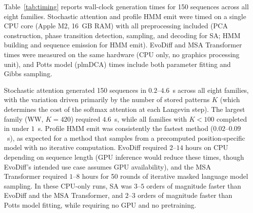 \documentclass[10pt]{article}
\begin{document}
Table~\ref{tab:timing} reports wall-clock generation times for 150 sequences across all eight families. Stochastic attention and profile HMM emit were timed on a single CPU core (Apple M2, 16~GB RAM) with all preprocessing included (PCA construction, phase transition detection, sampling, and decoding for SA; HMM building and sequence emission for HMM emit). EvoDiff and MSA Transformer times were measured on the same hardware (CPU only, no graphics processing unit), and Potts model (plmDCA) times include both parameter fitting and Gibbs sampling.

Stochastic attention generated 150 sequences in $0.2$--$4.6$~s across all eight families, with the variation driven primarily by the number of stored patterns $K$ (which determines the cost of the softmax attention at each Langevin step). The largest family (WW, $K{=}420$) required $4.6$~s, while all families with $K < 100$ completed in under $1$~s. Profile HMM emit was consistently the fastest method ($0.02$--$0.09$~s), as expected for a method that samples from a precomputed position-specific model with no iterative computation. EvoDiff required $2$--$14$ hours on CPU depending on sequence length (GPU inference would reduce these times, though EvoDiff's intended use case assumes GPU availability), and the MSA Transformer required $1$--$8$ hours for 50 rounds of iterative masked language model sampling. In these CPU-only runs, SA was $3$--$5$ orders of magnitude faster than EvoDiff and the MSA Transformer, and $2$--$3$ orders of magnitude faster than Potts model fitting, while requiring no GPU and no pretraining.
\end{document}
